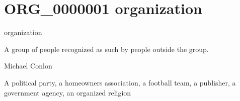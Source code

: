 \documentclass[letterpaper,10pt,english]{sphinxmanual}
\begin{document}
\begin{sphinxShadowBox}

\sphinxAtStartPar
{}
\end{sphinxShadowBox}
\begin{quote}
\label{\detokenize{doc-ORG_0000001:org-0000001}}\label{\detokenize{doc-ORG_0000001:organization}}\label{\detokenize{doc-ORG_0000001:org-0000001}}
\ignorespaces \end{quote}


\section{ORG\_0000001 \sphinxhyphen{} organization}
\label{\detokenize{doc-ORG_0000001:org-0000001-organization}}\label{\detokenize{doc-ORG_0000001:index-0}}\label{\detokenize{doc-ORG_0000001::doc}}
\begin{sphinxShadowBox}

\sphinxAtStartPar
organization
\end{sphinxShadowBox}

\begin{sphinxShadowBox}

\sphinxAtStartPar
A group of people recognized as such by people outside the group.
\end{sphinxShadowBox}

\begin{sphinxShadowBox}

\sphinxAtStartPar
Michael Conlon 
\end{sphinxShadowBox}

\begin{sphinxShadowBox}

\sphinxAtStartPar
A political party, a homeowners association, a football team, a publisher, a government agency, an organized religion
\end{sphinxShadowBox}

\begin{sphinxShadowBox}

\sphinxAtStartPar
{}
\end{sphinxShadowBox}
\end{document}
